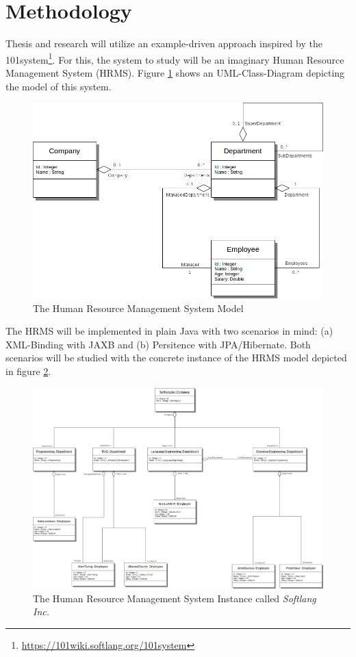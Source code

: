 \documentclass[runningheads,a4paper]{llncs}
\newcommand{\footnoteurl}[1]{\footnote{\url{#1}}}
\begin{document}
\section{Methodology}
\label{section:Methodology}
Thesis and research will utilize an example-driven approach inspired by the 101system\footnoteurl{https://101wiki.softlang.org/101system}.
For this, the system to study will be an imaginary Human Resource Management System (HRMS).
Figure \ref{figure:TheCompanyModel} shows an UML-Class-Diagram depicting the model of this system.

\begin{figure}[h!]
\centering
\includegraphics[width=.8\textwidth]{companies.png}
\caption{The Human Resource Management System Model}
\label{figure:TheCompanyModel}
\end{figure}

The HRMS will be implemented in plain Java with two scenarios in mind:
(a) XML-Binding with JAXB
and (b) Persitence with JPA/Hibernate.
Both scenarios will be studied with the concrete instance of the HRMS model depicted in figure \ref{figure:TheCompanyInstanceCalledSoftlangInc}.

\begin{figure}[h!]
\centering
\includegraphics[width=.8\textwidth]{softlanginc.png}
\caption{The Human Resource Management System Instance called \textit{Softlang Inc.}}
\label{figure:TheCompanyInstanceCalledSoftlangInc}
\end{figure}
\end{document}
